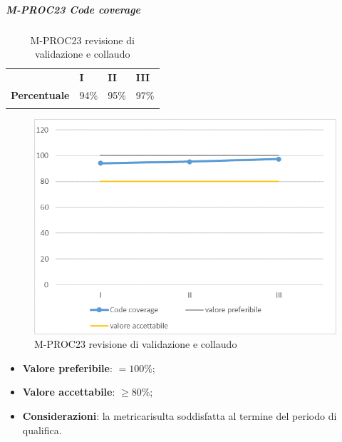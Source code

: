 \subparagraph{M-PROC23 Code coverage} \mbox{}
\begin{longtable}[H!] {						
		>{}p{35mm}  		
		>{}p{12mm}
		>{}p{12mm}		
		>{}p{12mm}		
	}
	\rowcolor{gray!50}
	\textbf{} & \textbf{I} & \textbf{II} & \textbf{III} \TBstrut \\ [2mm]
	\textbf{Percentuale} & 94\% & 95\% & 97\% \TBstrut \\ [2mm]
	\rowcolor{white}
	\caption{M-PROC23 revisione di validazione e collaudo}
\end{longtable}
\begin{figure}[H] 	
	\includegraphics[width=\linewidth]{./img/grafici/RA23.png}	
	\caption{M-PROC23 revisione di validazione e collaudo}	
\end{figure}
\begin{itemize}
	\item \textbf{Valore preferibile}: $=100\%$;
	\item \textbf{Valore accettabile}: $\ge 80\%$;
	\item \textbf{Considerazioni}: la metrica\glosp risulta soddisfatta al termine del periodo di qualifica.
\end{itemize}

